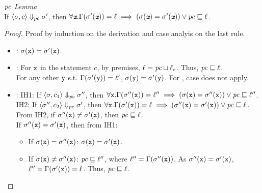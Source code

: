 \begin{myLemma}{\emph{$\mathit{pc}$ Lemma}}\\
\label{lem:app:gpua:pcl}
If $\langle \sigma, c \rangle \Downarrow_{\mathit{pc}} \sigma'$, then $\forall
\emph{\texttt{x}}.\Gamma(\sigma'(\emph{\texttt{x}})) = \ell \implies
(\sigma(\emph{\texttt{x}}) = \sigma'(\emph{\texttt{x}})) \vee \mathit{pc} 
\sqsubseteq \ell$.
\end{myLemma}
\begin{proof}
Proof by induction on the derivation and case analyis on the last
rule.
\begin{itemize}
  \item {}: $\sigma(\texttt{x}) = \sigma'(\texttt{x})$. 
  \item {}: For $\texttt{x}$ in the statement $c$, by premises, $\ell = \mathit{pc}
    \sqcup \ell_e$. Thus, $\mathit{pc} \sqsubseteq \ell$.\\
    For any other $\texttt{y}$ s.t. $\Gamma(\sigma'(\texttt{y})) = \ell'$, $\sigma(\texttt{y}) =
    \sigma'(\texttt{y})$. For , case does not apply.
  \item {}: IH1: If $\langle \sigma, c_1 \rangle \Downarrow_{\mathit{pc}} \sigma''$, then $\forall
    \texttt{x}.\Gamma(\sigma''(\texttt{x})) = \ell'' \implies (\sigma(\texttt{x}) = \sigma''(\texttt{x})) \vee \mathit{pc}
    \sqsubseteq \ell''$.\\
    IH2: If $\langle \sigma'', c_2 \rangle \Downarrow_{\mathit{pc}} \sigma'$, then $\forall
    \texttt{x}.\Gamma(\sigma'(\texttt{x})) = \ell \implies (\sigma''(\texttt{x}) = \sigma'(\texttt{x})) \vee \mathit{pc}
    \sqsubseteq \ell$.\\
    From IH2, if $\sigma''(\texttt{x}) \neq \sigma'(\texttt{x})$, then $\mathit{pc} \sqsubseteq
    \ell$.\\
    If $\sigma''(\texttt{x}) = \sigma'(\texttt{x})$, then from IH1:
    \begin{itemize}
    \item If $\sigma(\texttt{x}) = \sigma''(\texttt{x})$: $\sigma(\texttt{x}) = \sigma'(\texttt{x})$.
    \item If $\sigma(\texttt{x}) \neq \sigma''(\texttt{x})$: $\mathit{pc} \sqsubseteq \ell''$,
      where $\ell'' = \Gamma(\sigma''(\texttt{x}))$. As $\sigma''(\texttt{x}) =
      \sigma'(\texttt{x})$, $\ell'' = \Gamma(\sigma'(\texttt{x})) = \ell$. Thus, $\mathit{pc}
      \sqsubseteq \ell$.
    \end{itemize}
    

\end{itemize}
\end{proof}
